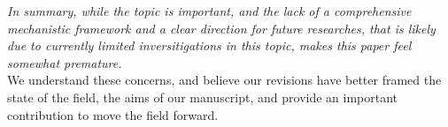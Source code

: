 \documentclass[11pt]{article}
\begin{document}
\emph{In summary, while the topic is important, and the lack of a comprehensive mechanistic framework and a clear direction for future researches, that is likely due to currently limited inversitigations in this topic, makes this paper feel somewhat premature.}\\

We understand these concerns, and believe our revisions have better framed the state of the field, the aims of our manuscript, and provide an important contribution to move the field forward.\\
\end{document}
